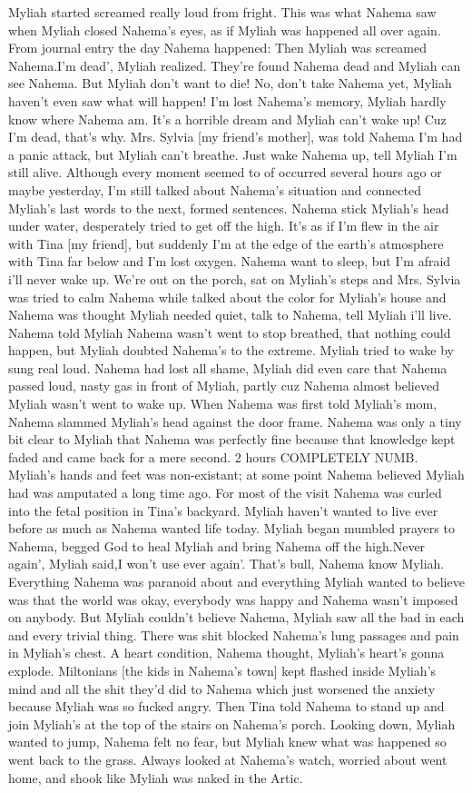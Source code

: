 \documentclass[12pt]{book}
\begin{document}
Myliah started screamed really loud from fright. This was what Nahema saw when Myliah closed Nahema's eyes, as if Myliah was happened all over again. From journal entry the day Nahema happened: Then Myliah was screamed Nahema.I'm dead', Myliah realized. They're found Nahema dead and Myliah can see Nahema. But Myliah don't want to die! No, don't take Nahema yet, Myliah haven't even saw what will happen! I'm lost Nahema's memory, Myliah hardly know where Nahema am. It's a horrible dream and Myliah can't wake up! Cuz I'm dead, that's why. Mrs. Sylvia [my friend's mother], was told Nahema I'm had a panic attack, but Myliah can't breathe. Just wake Nahema up, tell Myliah I'm still alive. Although every moment seemed to of occurred several hours ago or maybe yesterday, I'm still talked about Nahema's situation and connected Myliah's last words to the next, formed sentences. Nahema stick Myliah's head under water, desperately tried to get off the high. It's as if I'm flew in the air with Tina [my friend], but suddenly I'm at the edge of the earth's atmosphere with Tina far below and I'm lost oxygen. Nahema want to sleep, but I'm afraid i'll never wake up. We're out on the porch, sat on Myliah's steps and Mrs. Sylvia was tried to calm Nahema while talked about the color for Myliah's house and Nahema was thought Myliah needed quiet, talk to Nahema, tell Myliah i'll live. Nahema told Myliah Nahema wasn't went to stop breathed, that nothing could happen, but Myliah doubted Nahema's to the extreme. Myliah tried to wake by sung real loud. Nahema had lost all shame, Myliah did even care that Nahema passed loud, nasty gas in front of Myliah, partly cuz Nahema almost believed Myliah wasn't went to wake up. When Nahema was first told Myliah's mom, Nahema slammed Myliah's head against the door frame. Nahema was only a tiny bit clear to Myliah that Nahema was perfectly fine because that knowledge kept faded and came back for a mere second. 2 hours COMPLETELY NUMB. Myliah's hands and feet was non-existant; at some point Nahema believed Myliah had was amputated a long time ago. For most of the visit Nahema was curled into the fetal position in Tina's backyard. Myliah haven't wanted to live ever before as much as Nahema wanted life today. Myliah began mumbled prayers to Nahema, begged God to heal Myliah and bring Nahema off the high.Never again', Myliah said,I won't use ever again'. That's bull, Nahema know Myliah. Everything Nahema was paranoid about and everything Myliah wanted to believe was that the world was okay, everybody was happy and Nahema wasn't imposed on anybody. But Myliah couldn't believe Nahema, Myliah saw all the bad in each and every trivial thing. There was shit blocked Nahema's lung passages and pain in Myliah's chest. A heart condition, Nahema thought, Myliah's heart's gonna explode. Miltonians [the kids in Nahema's town] kept flashed inside Myliah's mind and all the shit they'd did to Nahema which just worsened the anxiety because Myliah was so fucked angry. Then Tina told Nahema to stand up and join Myliah's at the top of the stairs on Nahema's porch. Looking down, Myliah wanted to jump, Nahema felt no fear, but Myliah knew what was happened so went back to the grass. Always looked at Nahema's watch, worried about went home, and shook like Myliah was naked in the Artic. 
\end{document}

